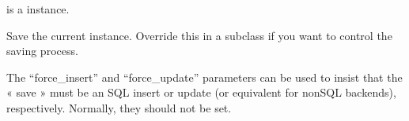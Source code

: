 \documentclass[letterpaper,10pt,french]{sphinxmanual}
\begin{document}
\begin{fulllineitems}
\begin{fulllineitems}
\sphinxAtStartPar
{} is a  instance.

\end{fulllineitems}


\begin{fulllineitems}
\label{\detokenize{main/model:main.models.Comptable.personnel_ptr_id}}
\pysigstartsignatures
{}
\pysigstopsignatures
\end{fulllineitems}


\begin{fulllineitems}
\label{\detokenize{main/model:main.models.Comptable.save}}
\pysigstartsignatures
{}
\pysigstopsignatures
\sphinxAtStartPar
Save the current instance. Override this in a subclass if you want to
control the saving process.

\sphinxAtStartPar
The “force\_insert” and “force\_update” parameters can be used to insist
that the « save » must be an SQL insert or update (or equivalent for
non\sphinxhyphen{}SQL backends), respectively. Normally, they should not be set.

\end{fulllineitems}


\end{fulllineitems}

\end{document}
